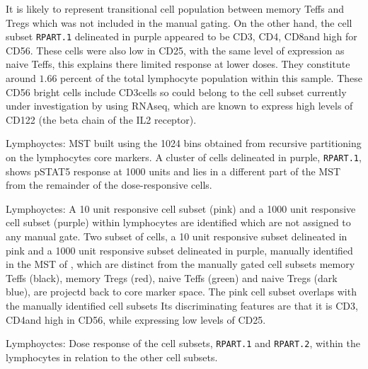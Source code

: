 It is likely to represent transitional cell population between memory Teffs and Tregs which was not included in the manual gating.
On the other hand, the cell subset \texttt{RPART.1} delineated in purple appeared to be CD3\negative, CD4\negative, CD8\negative and high for CD56.
These cells were also low in CD25, with the same level of expression as naive Teffs, this explains there limited response at lower doses.
They constitute around $1.66$ percent of the total lymphocyte population within this sample.
These CD56 bright cells include CD3\negative cells so could belong to the cell subset currently under investigation by  using RNAseq,
which are known to express high levels of CD122 (the beta chain of the IL2 receptor).


%
{ Lymphoyctes: MST built using the 1024 bins obtained from recursive partitioning on the lymphocytes core markers.}
{
    A cluster of cells delineated in purple, \texttt{RPART.1}, shows pSTAT5 response at 1000 units and lies in a different part of the \gls{MST} from the remainder of the dose-responsive cells.
}

{  Lymphoyctes: A 10 unit responsive cell subset (pink) and a 1000 unit responsive cell subset (purple) within lymphocytes are identified which are not assigned to any manual gate.  }
{
  Two subset of cells, a 10 unit responsive subset delineated in pink and a 1000 unit responsive subset delineated in purple,
  manually identified in the MST of ,
  which are distinct from the manually gated cell subsets memory Teffs (black), memory Tregs (red), naive Teffs (green) and naive Tregs (dark blue),
  are projectd back to core marker space.
  The pink cell subset overlaps with the manually identified cell subsets
  Its discriminating features are that it is CD3\negative, CD4\negative and high in CD56, while expressing low levels of CD25.
}

{  Lymphoyctes: Dose response of the cell subsets, \texttt{RPART.1} and \texttt{RPART.2}, within the lymphocytes in relation to the other cell subsets. }
{ }

